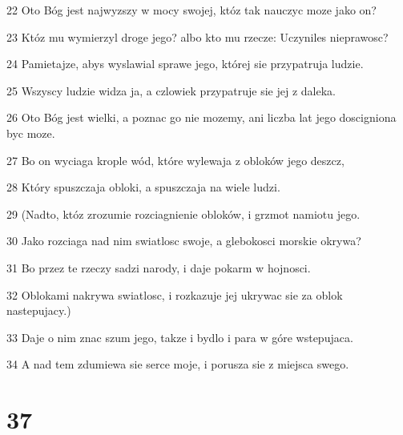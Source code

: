 \par 22 Oto Bóg jest najwyzszy w mocy swojej, któz tak nauczyc moze jako on?
\par 23 Któz mu wymierzyl droge jego? albo kto mu rzecze: Uczyniles nieprawosc?
\par 24 Pamietajze, abys wyslawial sprawe jego, której sie przypatruja ludzie.
\par 25 Wszyscy ludzie widza ja, a czlowiek przypatruje sie jej z daleka.
\par 26 Oto Bóg jest wielki, a poznac go nie mozemy, ani liczba lat jego doscigniona byc moze.
\par 27 Bo on wyciaga krople wód, które wylewaja z obloków jego deszcz,
\par 28 Który spuszczaja obloki, a spuszczaja na wiele ludzi.
\par 29 (Nadto, któz zrozumie rozciagnienie obloków, i grzmot namiotu jego.
\par 30 Jako rozciaga nad nim swiatlosc swoje, a glebokosci morskie okrywa?
\par 31 Bo przez te rzeczy sadzi narody, i daje pokarm w hojnosci.
\par 32 Oblokami nakrywa swiatlosc, i rozkazuje jej ukrywac sie za oblok nastepujacy.)
\par 33 Daje o nim znac szum jego, takze i bydlo i para w góre wstepujaca.
\par 34 A nad tem zdumiewa sie serce moje, i porusza sie z miejsca swego.

\chapter{37}

